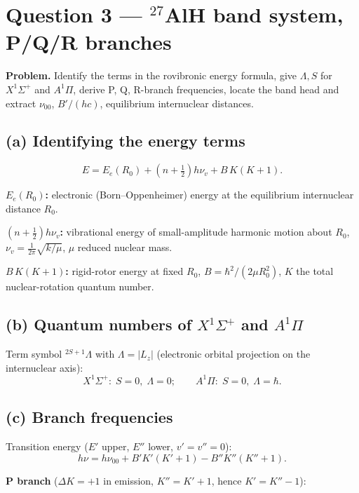 \documentclass[11pt]{article}
\begin{document}
\section*{Question 3 --- ${}^{27}$AlH band system, P/Q/R branches}

\textbf{Problem.}
Identify the terms in the rovibronic energy formula, give $\Lambda,S$ for $X^{1}\!\Sigma^{+}$ and $A^{1}\!\Pi$, derive P, Q, R-branch frequencies, locate the band head and extract $\nu_{00}$, $B'/(hc)$, equilibrium internuclear distances.

\subsection*{(a) Identifying the energy terms}

\[
E=E_{e}(R_{0})+(n+\tfrac12)h\nu_{v}+B\,K(K+1).
\]

\textbf{$E_{e}(R_{0})$:} electronic (Born--Oppenheimer) energy at the equilibrium internuclear distance $R_{0}$.

\textbf{$(n+\tfrac12)h\nu_{v}$:} vibrational energy of small-amplitude harmonic motion about $R_{0}$, $\nu_{v}=\tfrac{1}{2\pi}\sqrt{k/\mu}$, $\mu$ reduced nuclear mass.

\textbf{$B\,K(K+1)$:} rigid-rotor energy at fixed $R_{0}$, $B=\hbar^{2}/(2\mu R_{0}^{2})$, $K$ the total nuclear-rotation quantum number.

\subsection*{(b) Quantum numbers of $X^{1}\!\Sigma^{+}$ and $A^{1}\!\Pi$}

Term symbol $^{2S+1}\!\Lambda$ with $\Lambda=|L_{z}|$ (electronic orbital projection on the internuclear axis):
\[
\boxed{\;X^{1}\!\Sigma^{+}:\;S=0,\;\Lambda=0;\qquad A^{1}\!\Pi:\;S=0,\;\Lambda=\hbar.\;}
\]

\subsection*{(c) Branch frequencies}

Transition energy ($E'$ upper, $E''$ lower, $v'=v''=0$):
\[
h\nu = h\nu_{00} + B'K'(K'+1) - B''K''(K''+1).
\]

\textbf{P branch} ($\Delta K=+1$ in emission, $K''=K'+1$, hence $K'=K''-1$):
\end{document}
